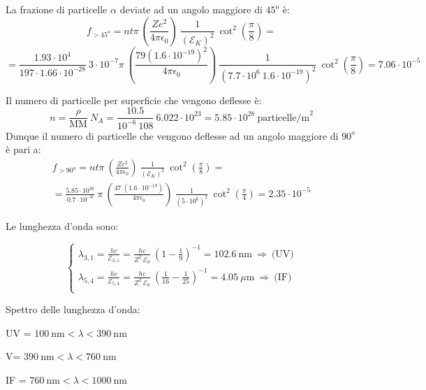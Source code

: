 \documentclass[12pt,twoside,a4]{article}
\begin{document}
\begin{solution}
	La frazione di particelle $\alpha$ deviate ad un angolo maggiore di $45^o$ è: 
\begin{equation*}
f_{>45^o} = n t \pi \ \left( \frac{Z e^2}{4\pi \epsilon_0}\right) \ \frac{1}{(\mathcal{E}_K)^2} \ \cot^2{\left(\frac{\pi}{8}\right)} =  
\end{equation*}
\begin{equation*}
 =  \frac{1.93 \cdot 10^{4}}{197 \cdot 1.66 \cdot 10^{-28}} \ 3 \cdot 10^{-7} \pi \ \left( \frac{79 (1.6 \cdot 10^{-19})^2}{4\pi \epsilon_0}\right) \ \frac{1}{(7.7 \cdot 10^6 \ 1.6 \cdot 10^{-19})^2} \ \cot^2{\left(\frac{\pi}{8}\right)} = 7.06 \cdot 10^{-5}   
\end{equation*}

\end{solution}

\begin{solution}
Il numero di particelle per superficie che vengono deflesse è: \begin{equation*}
n = \frac{\rho}{\mathrm{MM}} \ N_A = \frac{10.5 }{10^{-6 } \ 108} \ 6.022 \cdot 10^{23} = 5.85 \cdot 10^{28} \ \mathrm{particelle/m}^2  
\end{equation*}
Dunque il numero di particelle che vengono deflesse ad un angolo maggiore di $90^o$ è pari a: \begin{gather*}
f_{> 90^o} = n t \pi \ \left( \frac{Z e^2}{4\pi \epsilon_0}\right) \ \frac{1}{(\mathcal{E}_K)^2} \ \cot^2{\left(\frac{\pi}{8}\right)} 
= \\ =  \frac{5.85 \cdot 10^{26}}{0.7 \cdot 10^{-6}} \ \pi \ \left( \frac{47 \ (1.6 \cdot 10^{-19})}{4\pi \epsilon_0}\right) \ \frac{1}{(5 \cdot 10^{6})^2} \ \cot^2{\left(\frac{\pi}{4}\right)} = 2.35 \cdot 10^{-5}   
\end{gather*}
\end{solution}

\newpage
\begin{solution}
	Le lunghezza d'onda sono:
\begin{large}
\begin{equation*}
  \begin{cases}
  \lambda_{3,1} = \frac{h c }{\mathcal{E}_{3,1}} = \frac{h c }{Z^2 \ \mathcal{E}_0} \ \left(1 - \frac{1}{9}\right)^{-1} = 102.6 \ \mathrm{nm}  \  \Rightarrow  \  \text{(UV)} \\
  \lambda_{5,4} = \frac{h c }{\mathcal{E}_{5,4}} = \frac{h c }{Z^2 \ \mathcal{E}_0} \ \left(\frac{1}{16} - \frac{1}{25}\right)^{-1} = 4.05 \ \mu \mathrm{m}   \  \Rightarrow  \  \text{(IF)} \\
  \end{cases}  
\end{equation*}
\end{large}

\bigskip
Spettro delle lunghezza d'onda:

UV = $100 \ \mathrm{nm} < \lambda < 390 \ \mathrm{nm}$

V= $390 \ \mathrm{nm} < \lambda < 760 \ \mathrm{nm}$


IF = $760 \ \mathrm{nm} < \lambda < 1000 \ \mathrm{nm}$

\end{solution}
\end{document}
